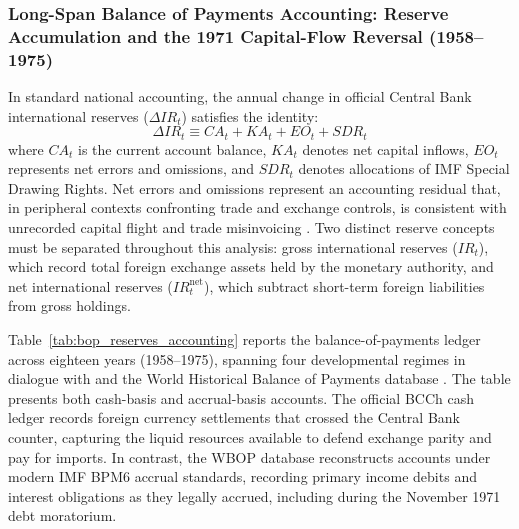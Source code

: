 \subsubsection{Long-Span Balance of Payments Accounting: Reserve Accumulation and the 1971 Capital-Flow Reversal (1958--1975)}
\label{sec:stylized_bop_accounting}

In standard national accounting, the annual change in official Central Bank international reserves ($\Delta IR_t$) satisfies the identity:
\begin{equation}
    \Delta IR_t \equiv CA_t + KA_t + EO_t + SDR_t
    \label{eq:bop_reserves_identity}
\end{equation}
where $CA_t$ is the current account balance, $KA_t$ denotes net capital inflows, $EO_t$ represents net errors and omissions, and $SDR_t$ denotes allocations of IMF Special Drawing Rights. Net errors and omissions represent an accounting residual that, in peripheral contexts confronting trade and exchange controls, is consistent with unrecorded capital flight and trade misinvoicing \citep{Stallings1978}. Two distinct reserve concepts must be separated throughout this analysis: gross international reserves ($IR_t$), which record total foreign exchange assets held by the monetary authority, and net international reserves ($IR^{\text{net}}_t$), which subtract short-term foreign liabilities from gross holdings.



Table~\ref{tab:bop_reserves_accounting} reports the balance-of-payments ledger across eighteen years (1958--1975), spanning four developmental regimes in dialogue with \citet{Stallings1978} and the World Historical Balance of Payments database \citep{NievasPiketty2025}. The table presents both cash-basis and accrual-basis accounts. The official BCCh cash ledger \citep[Table~7.4, p.~178]{Stallings1978} records foreign currency settlements that crossed the Central Bank counter, capturing the liquid resources available to defend exchange parity and pay for imports. In contrast, the WBOP database \citep{NievasPiketty2025} reconstructs accounts under modern IMF BPM6 accrual standards, recording primary income debits and interest obligations as they legally accrued, including during the November 1971 debt moratorium.

